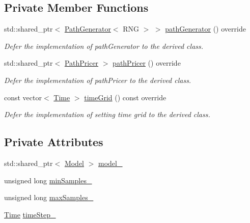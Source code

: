 \subsection*{Private Member Functions}
\begin{DoxyCompactItemize}
\item 
std\+::shared\+\_\+ptr$<$ \hyperlink{class_path_generator}{Path\+Generator}$<$ R\+NG $>$ $>$ \hyperlink{class_mc_european_engine_af3bd77fe30b60833448ee44efe6280d9}{path\+Generator} () override
\begin{DoxyCompactList}\small\item\em Defer the implementation of path\+Generator to the derived class. \end{DoxyCompactList}\item 
std\+::shared\+\_\+ptr$<$ \hyperlink{class_path_pricer}{Path\+Pricer} $>$ \hyperlink{class_mc_european_engine_aa504b56142c757d49cc4c9e079682f6d}{path\+Pricer} () override
\begin{DoxyCompactList}\small\item\em Defer the implementation of path\+Pricer to the derived class. \end{DoxyCompactList}\item 
const vector$<$ \hyperlink{_name_def_8h_ac2d3e0ba793497bcca555c7c2cf64ff3}{Time} $>$ \hyperlink{class_mc_european_engine_a62341229306247e5c1eed9a7d4a2dba3}{time\+Grid} () const override
\begin{DoxyCompactList}\small\item\em Defer the implementation of setting time grid to the derived class. \end{DoxyCompactList}\end{DoxyCompactItemize}
\subsection*{Private Attributes}
\begin{DoxyCompactItemize}
\item 
std\+::shared\+\_\+ptr$<$ \hyperlink{class_model}{Model} $>$ \hyperlink{class_mc_european_engine_a81d241a7b2c065d2ecb9c8ed367f65b6}{model\+\_\+}
\item 
unsigned long \hyperlink{class_mc_european_engine_a1fc3ac7c29f0ebb565d4f3a6a0baa315}{min\+Samples\+\_\+}
\item 
unsigned long \hyperlink{class_mc_european_engine_a4f951d1b93039bb0cf5e65abb1d61f2e}{max\+Samples\+\_\+}
\item 
\hyperlink{_name_def_8h_ac2d3e0ba793497bcca555c7c2cf64ff3}{Time} \hyperlink{class_mc_european_engine_aa2e85e2348747a35494677719b023991}{time\+Step\+\_\+}
\end{DoxyCompactItemize}
